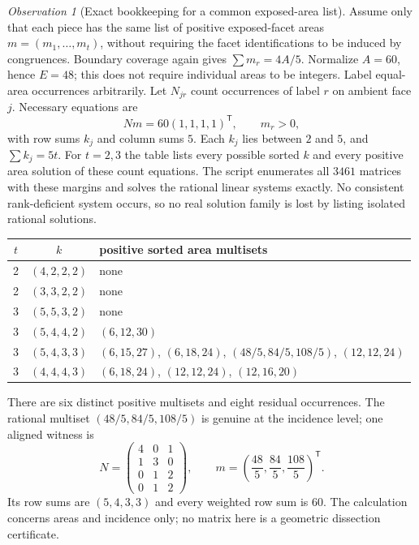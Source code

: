 \documentclass[11pt,a4paper]{article}
\theoremstyle{plain}
\theoremstyle{definition}
\theoremstyle{remark}
\newtheorem{observation}[observation]{Observation}
\begin{document}
\begin{observation}[Exact bookkeeping for a common exposed-area list]
\label{obs:n5-area}
Assume only that each piece has the same list of positive exposed-facet areas
$m=(m_1,\ldots,m_t)$, without requiring the facet identifications to be
induced by congruences.  Boundary coverage again gives $\sum m_r=4A/5$.
Normalize $A=60$, hence $E=48$; this does not require individual areas to be
integers.  Label equal-area occurrences arbitrarily.  Let $N_{jr}$ count
occurrences of label $r$ on ambient face $j$.  Necessary equations are
\[
 N m=60(1,1,1,1)^\mathsf{T},\qquad m_r>0,
\]
with row sums $k_j$ and column sums $5$.  Each $k_j$ lies between $2$ and
$5$, and $\sum k_j=5t$.  For $t=2,3$ the table lists every possible sorted
$k$ and every positive area solution of these count equations.  The script
 enumerates all $3461$ matrices
with these margins and solves the rational linear systems exactly.  No
consistent rank-deficient system occurs, so no real solution family is lost
by listing isolated rational solutions.
\begin{center}
\begin{tabular}{c c l}
\toprule
$t$ & $k$ & positive sorted area multisets\\
\midrule
2 & $(4,2,2,2)$ & none\\
2 & $(3,3,2,2)$ & none\\
3 & $(5,5,3,2)$ & none\\
3 & $(5,4,4,2)$ & $(6,12,30)$\\
3 & $(5,4,3,3)$ & $(6,15,27)$, $(6,18,24)$, $(48/5,84/5,108/5)$, $(12,12,24)$\\
3 & $(4,4,4,3)$ & $(6,18,24)$, $(12,12,24)$, $(12,16,20)$\\
\bottomrule
\end{tabular}
\end{center}
There are six distinct positive multisets and eight residual occurrences.  The
rational multiset $(48/5,84/5,108/5)$ is genuine at the incidence level; one
aligned witness is
\[
 N=\begin{pmatrix}4&0&1\\1&3&0\\0&1&2\\0&1&2\end{pmatrix},
 \qquad
 m=\left(\frac{48}{5},\frac{84}{5},\frac{108}{5}\right)^\mathsf{T}.
\]
Its row sums are $(5,4,3,3)$ and every weighted row sum is $60$.  The
calculation concerns areas and incidence only; no matrix here is a geometric
dissection certificate.
\end{observation}
\end{document}
